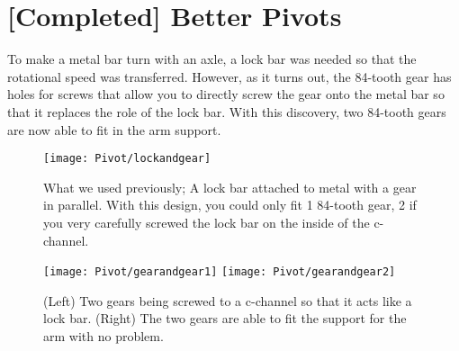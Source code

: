 \section{[Completed] Better Pivots}

To make a metal bar turn with an axle, a lock bar was needed so that the rotational speed was transferred. However, as it turns out, the 84-tooth gear has holes for screws that allow you to directly screw the gear onto the metal bar so that it replaces the role of the lock bar. With this discovery, two 84-tooth gears are now able to fit in the arm support.

\begin{figure}[h]
    \centering
    \texttt{[image: Pivot/lockandgear]}
    \caption{
        What we used previously; A lock bar attached to metal with a gear in parallel. With this design, you could only fit 1 84-tooth gear, 2 if you very carefully screwed the lock bar on the inside of the c-channel.
    }
\end{figure}

\begin{figure}[h]
    \centering
    \texttt{[image: Pivot/gearandgear1]}
    \texttt{[image: Pivot/gearandgear2]}
    \caption{
        (Left) Two gears being screwed to a c-channel so that it acts like a lock bar. (Right) The two gears are able to fit the support for the arm with no problem.
    }
\end{figure}
